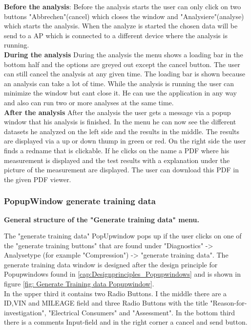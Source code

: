 \documentclass[]{scrreprt}
\begin{document}
\textbf{Before the analysis}: 
Before the analysis starts the user can only click on two buttons "Abbrechen"(cancel) which closes the window and "Analysiere"(analyse) which starts the analysis. When the analyze is started the chosen data will be send to a AP which is connected to a different device where the analysis is running. \\

\textbf{During the analysis}
During the analysis the menu shows a loading bar in the bottom half and the options are greyed out except the cancel button. The user can still cancel the analysis at any given time. 
The loading bar is shown because an analysis can take a lot of time. While the analysis is running the user can minimize the window but cant close it. He can use the application in any way and also can run two or more analyses at the same time.\\

\textbf{After the analysis}
After the analysis the user gets a message via a popup window that his analysis is finished. In the menu he can now see the different datasets he analyzed on the left side and the results in the middle. 
The results are displayed via a up or down thump in green or red. On the right side the user finds a redname that is clickable. If he clicks on the name a PDF where his measurement is displayed and the test results with a explanation under the picture of the measurement are displayed. The user can download this PDF in the given PDF viewer.  



\subsubsection{PopupWindow generate training data}\label{cap: PopupWindow_generate_training_data}

\textbf{General structure of the "Generate training data" menu.} 

The "generate training data" PopUpwindow pops up if the user clicks on one of the "generate training buttons" that are found under "Diagnostics" -> Analysetype (for example "Compression") -> "generate training data". The generate training data window is designed after the design principle for Popupwindows found in \ref{cap:Designprinciples_Popupwindows} and is shown in figure \ref{fig: Generate Training data Popupwindow}.\\  In the upper third it contains two Radio Buttons. I the middle there are a ID,VIN and MILEAGE field and three Radio Buttons with the title "Reason-for-investigation", "Electrical Consumers" and "Assessment". In the bottom third there is a comments Input-field and in the right corner a cancel and send button. 
\end{document}
